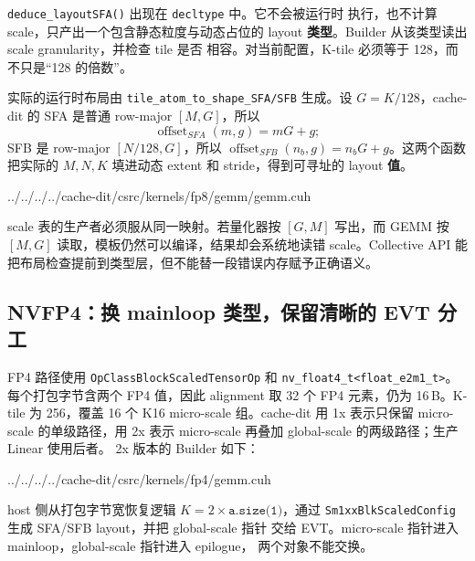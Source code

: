 \texttt{deduce\_layoutSFA()} 出现在 \texttt{decltype} 中。它不会被运行时
执行，也不计算 scale，只产出一个包含静态粒度与动态占位的 layout
\textbf{类型}。Builder 从该类型读出 scale granularity，并检查 tile 是否
相容。对当前配置，K-tile 必须等于 128，而不只是“128 的倍数”。

实际的运行时布局由 \texttt{tile\_atom\_to\_shape\_SFA/SFB} 生成。设
$G=K/128$，cache-dit 的 SFA 是普通 row-major $[M,G]$，所以
\begin{equation}
  \operatorname{offset}_{SFA}(m,g)=mG+g;
  \label{eq:41-sfa-offset}
\end{equation}
SFB 是 row-major $[N/128,G]$，所以
$\operatorname{offset}_{SFB}(n_b,g)=n_bG+g$。这两个函数把实际的 $M,N,K$
填进动态 extent 和 stride，得到可寻址的 layout \textbf{值}。

\begin{lstinputlisting}[linerange={547-569},firstnumber=auto,
  title={cache-dit fp8/gemm/gemm.cuh L547--569（运行时 SFA/SFB layout 与 mainloop 参数）}]{../../../../cache-dit/csrc/kernels/fp8/gemm/gemm.cuh}
\end{lstinputlisting}

scale 表的生产者必须服从同一映射。若量化器按 $[G,M]$ 写出，而 GEMM
按 $[M,G]$ 读取，模板仍然可以编译，结果却会系统地读错 scale。Collective
API 能把布局检查提前到类型层，但不能替一段错误内存赋予正确语义。

\subsection{NVFP4：换 mainloop 类型，保留清晰的 EVT 分工}

FP4 路径使用 \texttt{OpClassBlockScaledTensorOp} 和
\texttt{nv\_float4\_t<float\_e2m1\_t>}。每个打包字节含两个 FP4 值，因此
alignment 取 32 个 FP4 元素，仍为 16\,B。K-tile 为 256，覆盖 16 个 K16
micro-scale 组。cache-dit 用 1x 表示只保留 micro-scale 的单级路径，用 2x
表示 micro-scale 再叠加 global-scale 的两级路径；生产 Linear 使用后者。
2x 版本的 Builder 如下：

\begin{lstinputlisting}[linerange={214-239},firstnumber=auto,
  title={cache-dit fp4/gemm.cuh L214--239（NVFP4 两级 collective）}]{../../../../cache-dit/csrc/kernels/fp4/gemm.cuh}
\end{lstinputlisting}

host 侧从打包字节宽恢复逻辑 $K=2\times\texttt{a.size(1)}$，通过
\texttt{Sm1xxBlkScaledConfig} 生成 SFA/SFB layout，并把 global-scale 指针
交给 EVT。micro-scale 指针进入 mainloop，global-scale 指针进入 epilogue，
两个对象不能交换。

